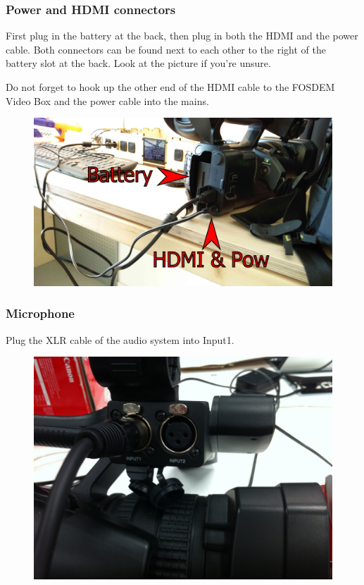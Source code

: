 \documentclass{article}
\begin{document}
\subsubsection{Power and HDMI connectors}
First plug in the battery at the back, then plug in both the HDMI and the power cable.
Both connectors can be found next to each other to the right of the battery slot at the back.
Look at the picture if you're unsure.

Do not forget to hook up the other end of the HDMI cable to the FOSDEM Video Box and the power cable into the mains.

\begin{figure}[H]
  \centering
\includegraphics[width = 120mm]{Sony01.jpg}
\end{figure}

\subsubsection{Microphone}
Plug the XLR cable of the audio system into Input1.

\begin{figure}[H]
  \centering
\includegraphics[width = 120mm]{sony_connect_xlr.jpg}
\end{figure}
\end{document}
